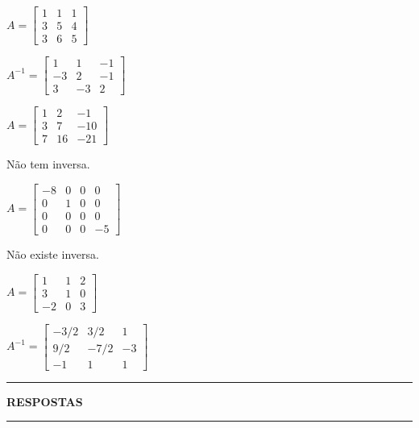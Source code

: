 \documentclass[12pt]{exam}
\begin{document}
\begin{exercicio}
  $
    A =\begin{bmatrix}
        1 & 1 & 1\\
        3 & 5 & 4\\
        3 & 6 & 5
      \end{bmatrix}
    $
  \begin{solucao}
    $
      A^{-1} =\begin{bmatrix}
        1 & 1 & -1\\
        -3 & 2 & -1\\
        3 & -3 & 2
      \end{bmatrix}
    $
  \end{solucao}
\end{exercicio}

\begin{exercicio}
  $
    A =\begin{bmatrix}
        1 & 2 & -1\\
        3 & 7 & -10\\
        7 & 16 & -21
    \end{bmatrix}
  $
  \begin{solucao}
    N\~ao tem inversa.
  \end{solucao}
\end{exercicio}

\begin{exercicio}
  $
    A =\begin{bmatrix}
        -8 & 0 & 0 & 0\\
        0 & 1 & 0 & 0\\
        0 & 0 & 0 & 0\\
        0 & 0 & 0 & -5
    \end{bmatrix}
  $
  \begin{solucao}
   N\~ao existe inversa.
  \end{solucao}
\end{exercicio}

\begin{exercicio}\label{matrizinversafim}
  $
    A =\begin{bmatrix}
        1 & 1 & 2\\
        3 & 1 & 0\\
        -2 & 0 & 3
    \end{bmatrix}
  $
  \begin{solucao}
    $
      A^{-1} =\begin{bmatrix}
        -3/2 & 3/2 & 1\\
        9/2 & -7/2 & -3\\
        -1 & 1 & 1
      \end{bmatrix}
    $
  \end{solucao}
\end{exercicio}

\newpage
{}
\hrule
\begin{center}
{\large\bf RESPOSTAS}
\end{center}
\hrule

\end{document}
